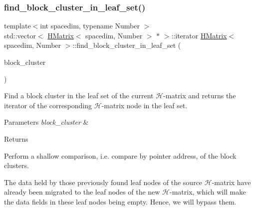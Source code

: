 \mbox{\label{classHMatrix_ab0f83de878e6079330ec3c374f587a04}} 
\subsubsection{\texorpdfstring{find\+\_\+block\+\_\+cluster\+\_\+in\+\_\+leaf\+\_\+set()}{find\_block\_cluster\_in\_leaf\_set()}\hspace{0.1cm}{\footnotesize\ttfamily [1/2]}}
{\footnotesize\ttfamily template$<$int spacedim, typename Number $>$ \\
std\+::vector$<$ \hyperlink{classHMatrix}{H\+Matrix}$<$ spacedim, Number $>$ $\ast$ $>$\+::iterator \hyperlink{classHMatrix}{H\+Matrix}$<$ spacedim, Number $>$\+::find\+\_\+block\+\_\+cluster\+\_\+in\+\_\+leaf\+\_\+set (\begin{DoxyParamCaption}\item[{const \hyperlink{classBlockCluster}{Block\+Cluster}$<$ spacedim, Number $>$ \&}]{block\+\_\+cluster }\end{DoxyParamCaption})}

Find a block cluster in the leaf set of the current $\mathcal{H}$-\/matrix and returns the iterator of the corresponding $\mathcal{H}$-\/matrix node in the leaf set.


\begin{DoxyParams}{Parameters}
{\em block\+\_\+cluster} & \\
\hline
\end{DoxyParams}
\begin{DoxyReturn}{Returns}

\end{DoxyReturn}
Perform a shallow comparison, i.\+e. compare by pointer address, of the block clusters.


\begin{DoxyDescription}
\item[Note ]The data held by those previously found leaf nodes of the source $\mathcal{H}$-\/matrix have already been migrated to the leaf nodes of the new $\mathcal{H}$-\/matrix, which will make the data fields in these leaf nodes being empty. Hence, we will bypass them. 
\end{DoxyDescription}

